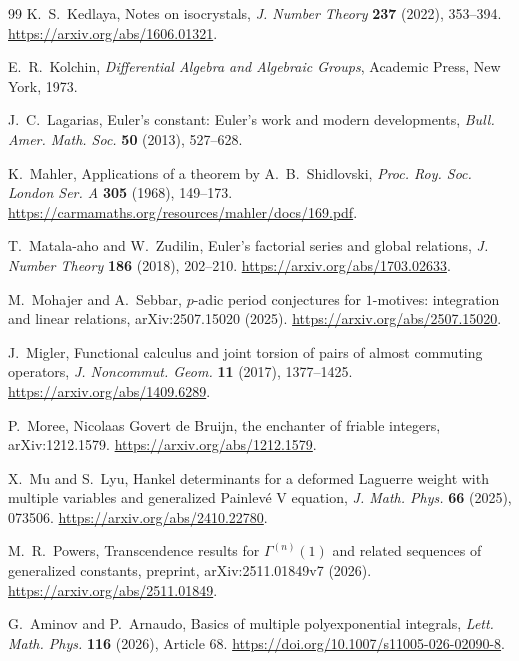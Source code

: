 \documentclass[11pt]{article}
\theoremstyle{definition}
\theoremstyle{remark}
\begin{document}
\begin{thebibliography}{99}
K.~S.~Kedlaya,
\newblock Notes on isocrystals,
\newblock \emph{J. Number Theory} \textbf{237} (2022), 353--394.
\newblock \url{https://arxiv.org/abs/1606.01321}.


E.~R.~Kolchin,
\newblock \emph{Differential Algebra and Algebraic Groups},
\newblock Academic Press, New York, 1973.

J.~C.~Lagarias,
\newblock Euler's constant: Euler's work and modern developments,
\newblock \emph{Bull. Amer. Math. Soc.} \textbf{50} (2013), 527--628.

K.~Mahler,
\newblock Applications of a theorem by A.~B.~Shidlovski,
\newblock \emph{Proc. Roy. Soc. London Ser. A} \textbf{305} (1968), 149--173.
\newblock \url{https://carmamaths.org/resources/mahler/docs/169.pdf}.

T.~Matala-aho and W.~Zudilin,
\newblock Euler's factorial series and global relations,
\newblock \emph{J. Number Theory} \textbf{186} (2018), 202--210.
\newblock \url{https://arxiv.org/abs/1703.02633}.

M.~Mohajer and A.~Sebbar,
\newblock \(p\)-adic period conjectures for \(1\)-motives: integration and
linear relations,
\newblock arXiv:2507.15020 (2025).
\newblock \url{https://arxiv.org/abs/2507.15020}.

J.~Migler,
\newblock Functional calculus and joint torsion of pairs of almost commuting
operators,
\newblock \emph{J. Noncommut. Geom.} \textbf{11} (2017), 1377--1425.
\newblock \url{https://arxiv.org/abs/1409.6289}.

P.~Moree,
\newblock Nicolaas Govert de Bruijn, the enchanter of friable integers,
\newblock arXiv:1212.1579.
\newblock \url{https://arxiv.org/abs/1212.1579}.

X.~Mu and S.~Lyu,
\newblock Hankel determinants for a deformed Laguerre weight with multiple
variables and generalized Painlev\'e V equation,
\newblock \emph{J. Math. Phys.} \textbf{66} (2025), 073506.
\newblock \url{https://arxiv.org/abs/2410.22780}.

M.~R.~Powers,
\newblock Transcendence results for \(\Gamma^{(n)}(1)\) and related sequences
of generalized constants,
\newblock preprint, arXiv:2511.01849v7 (2026).
\newblock \url{https://arxiv.org/abs/2511.01849}.

G.~Aminov and P.~Arnaudo,
\newblock Basics of multiple polyexponential integrals,
\newblock \emph{Lett. Math. Phys.} \textbf{116} (2026), Article 68.
\newblock \url{https://doi.org/10.1007/s11005-026-02090-8}.


\end{thebibliography}
\end{document}

